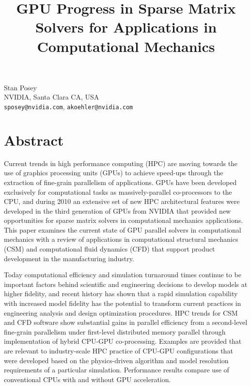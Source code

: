 \title{GPU Progress in Sparse Matrix Solvers for Applications in Computational Mechanics}
\author{} \institute{}
\maketitle
\begin{center}
{\large Stan Posey}\\
NVIDIA, Santa Clara CA, USA\\
{\tt sposey@nvidia.com}, {\tt akoehler@nvidia.com}

\end{center}

\section*{Abstract}

Current trends in high performance computing (HPC) are moving towards the use of graphics processing units (GPUs) to achieve speed-ups through the extraction of fine-grain parallelism of applications. GPUs have been developed exclusively for computational tasks as massively-parallel co-processors to the CPU, and during 2010 an extensive set of new HPC architectural features were developed in the third generation of GPUs from NVIDIA that provided new opportunities for sparse matrix solvers in computational mechanics applications. This paper examines the current state of GPU parallel solvers in computational mechanics with a review of applications in computational structural mechanics (CSM) and computational fluid dynamics (CFD) that support product development in the manufacturing industry. 

Today computational efficiency and simulation turnaround times continue to be important factors behind scientific and engineering decisions to develop models at higher fidelity, and recent history has shown that a rapid simulation capability with increased model fidelity has the potential to transform current practices in engineering analysis and design optimization procedures. HPC trends for CSM and CFD software show substantial gains in parallel efficiency from a second-level fine-grain parallelism under first-level distributed memory parallel through implementation of hybrid CPU-GPU co-processing. Examples are provided that are relevant to industry-scale HPC practice of CPU-GPU configurations that were developed based on the physics-driven algorithm and model resolution requirements of a particular simulation. Performance results compare use of conventional CPUs with and without GPU acceleration.

